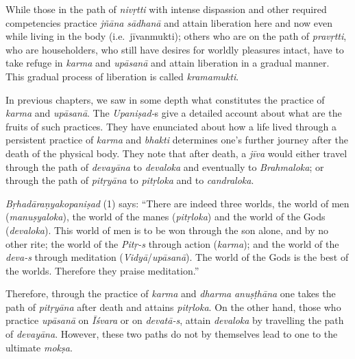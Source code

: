 While those in the path of \emph{nivṛtti} with intense dispassion and other required competencies practice \emph{jñāna} \emph{sādhanā} and attain liberation here and now even while living in the body (i.e.\ jīvanmukti); others who are on the path of \emph{pravṛtti}, who are householders, who still have desires for worldly pleasures intact, have to take refuge in \emph{karma} and \emph{upāsanā} and attain liberation in a gradual manner. This gradual process of liberation is called \emph{kramamukti}.

In previous chapters, we saw in some depth what constitutes the practice of \emph{karma} and \emph{upāsanā}. The \emph{Upaniṣad-}s give a detailed account about what are the fruits of such practices. They have enunciated about how a life lived through a persistent practice of \emph{karma} and \emph{bhakti} determines one's further journey after the death of the physical body. They note that after death, a \emph{jīva} would either travel through the path of \emph{devayāna} to \emph{devaloka} and eventually to \emph{Brahmaloka}; or through the path of \emph{pitṛyāna} to \emph{pitṛloka} and to \emph{candraloka}.

\emph{Bṛhadāraṇyakopaniṣad} (1) says: ``There are indeed three worlds, the world of men (\emph{manuṣyaloka}), the world of the manes (\emph{pitṛloka}) and the world of the Gods (\emph{devaloka}). This world of men is to be won through the son alone, and by no other rite; the world of the \emph{Pitṛ-s} through action (\emph{karma}); and the world of the \emph{deva-s} through meditation (\emph{Vidyā}/\emph{upāsanā}). The world of the Gods is the best of the worlds. Therefore they praise meditation.''

Therefore, through the practice of \emph{karma} and \emph{dharma} \emph{anuṣṭhāna} one takes the path of \emph{pitṛyāna} after death and attains \emph{pitṛloka}. On the other hand, those who practice \emph{upāsanā} on \emph{Īśvara} or on \emph{devatā-s}, attain \emph{devaloka} by travelling the path of \emph{devayāna}. However, these two paths do not by themselves lead to one to the ultimate \emph{mokṣa}.
\newpage

